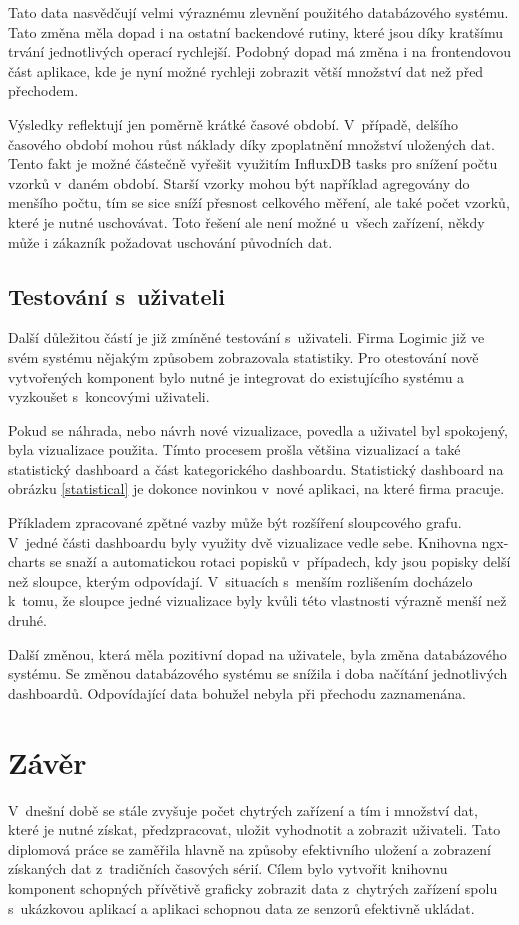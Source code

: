 Tato data nasvědčují velmi výraznému zlevnění použitého databázového systému. Tato změna měla dopad i na ostatní backendové rutiny, které jsou díky kratšímu trvání jednotlivých operací rychlejší. Podobný dopad má změna i na frontendovou část aplikace, kde je nyní možné rychleji zobrazit větší množství dat než před přechodem.

Výsledky reflektují jen poměrně krátké časové období. V~případě, delšího časového období mohou růst náklady díky zpoplatnění množství uložených dat. Tento fakt je možné částečně vyřešit využitím InfluxDB tasks pro snížení počtu vzorků v~daném období. Starší vzorky mohou být například agregovány do menšího počtu, tím se sice sníží přesnost celkového měření, ale také počet vzorků, které je nutné uschovávat. Toto řešení ale není možné u~všech zařízení, někdy může i zákazník požadovat uschování původních dat.

\section{Testování s~uživateli}
Další důležitou částí je již zmíněné testování s~uživateli. Firma Logimic již ve svém systému nějakým způsobem zobrazovala statistiky. Pro otestování nově vytvořených komponent bylo nutné je integrovat do existujícího systému a vyzkoušet s~koncovými uživateli.

Pokud se náhrada, nebo návrh nové vizualizace, povedla a uživatel byl spokojený, byla vizualizace použita. Tímto procesem prošla většina vizualizací a také statistický dashboard a část kategorického dashboardu. Statistický dashboard na obrázku \ref{statistical} je dokonce novinkou v~nové aplikaci, na které firma pracuje.

Příkladem zpracované zpětné vazby může být rozšíření sloupcového grafu. V~jedné části dashboardu byly využity dvě vizualizace vedle sebe. Knihovna ngx-charts se snaží a automatickou rotaci popisků v~případech, kdy jsou popisky delší než sloupce, kterým odpovídají. V~situacích s~menším rozlišením docházelo k~tomu, že sloupce jedné vizualizace byly kvůli této vlastnosti výrazně menší než druhé.

Další změnou, která měla pozitivní dopad na uživatele, byla změna databázového systému. Se změnou databázového systému se snížila i doba načítání jednotlivých dashboardů. Odpovídající data bohužel nebyla při přechodu zaznamenána.

\label{chapter_testing}
\chapter{Závěr}
V~dnešní době se stále zvyšuje počet chytrých zařízení a tím i množství dat, které je nutné získat, předzpracovat, uložit vyhodnotit a zobrazit uživateli. Tato diplomová práce se zaměřila hlavně na způsoby efektivního uložení a zobrazení získaných dat z~tradičních časových sérií. Cílem bylo vytvořit knihovnu komponent schopných přívětivě graficky zobrazit data z~chytrých zařízení spolu s~ukázkovou aplikací a aplikaci schopnou data ze senzorů efektivně ukládat.

